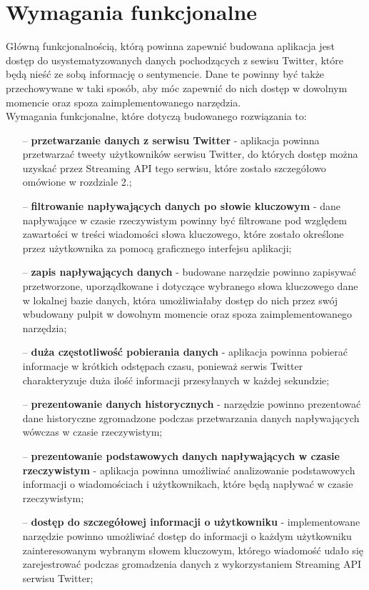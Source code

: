 \section{Wymagania funkcjonalne}
Główną funkcjonalnością, którą powinna zapewnić budowana aplikacja jest dostęp do usystematyzowanych danych pochodzących z sewisu Twitter, które będą nieść ze sobą informację o sentymencie. Dane te powinny być także przechowywane w taki sposób, aby móc zapewnić do nich dostęp w dowolnym momencie oraz spoza zaimplementowanego narzędzia. \\
Wymagania funkcjonalne, które dotyczą budowanego rozwiązania to: 
\begin{itemize}
	\item[--] \textbf{przetwarzanie danych z serwisu Twitter} - aplikacja powinna przetwarzać tweety użytkowników serwisu Twitter, do których dostęp można uzyskać przez Streaming API tego serwisu, które zostało szczegółowo omówione w rozdziale 2.; 
	\item[--] \textbf{filtrowanie napływających danych po słowie kluczowym} - dane napływające w czasie rzeczywistym powinny być filtrowane pod względem zawartości w treści wiadomości słowa kluczowego, które zostało określone przez użytkownika za pomocą graficznego interfejsu aplikacji;
	\item[--] \textbf{zapis napływających danych} - budowane narzędzie powinno zapisywać przetworzone, uporządkowane i dotyczące wybranego słowa kluczowego dane w lokalnej bazie danych, która umożliwiałaby dostęp do nich przez swój wbudowany pulpit w dowolnym momencie oraz spoza zaimplementowanego narzędzia;
	\item[--] \textbf{duża częstotliwość pobierania danych} - aplikacja powinna pobierać informacje w krótkich odstępach czasu, ponieważ serwis Twitter charakteryzuje duża ilość informacji przesyłanych w każdej sekundzie;
	\item[--] \textbf{prezentowanie danych historycznych} - narzędzie powinno prezentować dane historyczne zgromadzone podczas przetwarzania danych napływających wówczas w czasie rzeczywistym;
	\item[--] \textbf{prezentowanie podstawowych danych napływających w czasie rzeczywistym} - aplikacja powinna umożliwiać analizowanie podstawowych informacji o wiadomościach i użytkownikach, które będą napływać w czasie rzeczywistym;
	\item[--] \textbf{dostęp do szczegółowej informacji o użytkowniku} - implementowane narzędzie powinno umożliwiać dostęp do informacji o każdym użytkowniku zainteresowanym wybranym słowem kluczowym, którego wiadomość udało się zarejestrować podczas gromadzenia danych z wykorzystaniem Streaming API serwisu Twitter;

\end{itemize}
